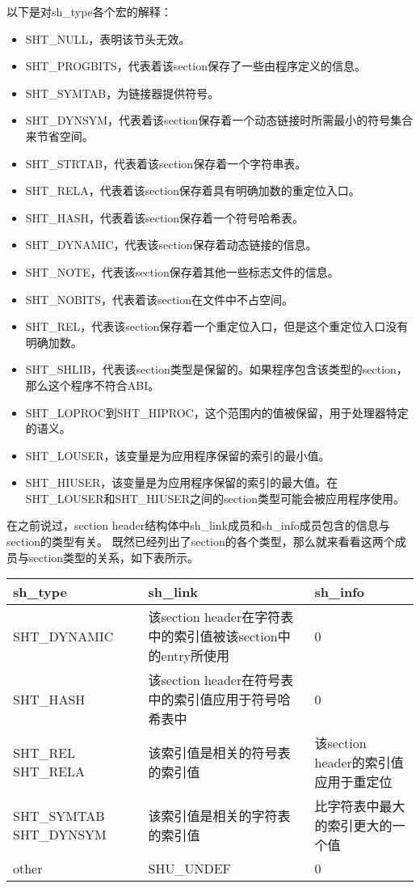 \documentclass[a4paper,left=2.5cm,right=2.5cm,11pt]{article}
\begin{document}
	以下是对sh\_type各个宏的解释：
	\begin{itemize}
		\item SHT\_NULL，表明该节头无效。
		\item SHT\_PROGBITS，代表着该section保存了一些由程序定义的信息。
		\item SHT\_SYMTAB，为链接器提供符号。
		\item SHT\_DYNSYM，代表着该section保存着一个动态链接时所需最小的符号集合来节省空间。
		\item SHT\_STRTAB，代表着该section保存着一个字符串表。
		\item SHT\_RELA，代表着该section保存着具有明确加数的重定位入口。
		\item SHT\_HASH，代表着该section保存着一个符号哈希表。
		\item SHT\_DYNAMIC，代表该section保存着动态链接的信息。
		\item SHT\_NOTE，代表该section保存着其他一些标志文件的信息。
		\item SHT\_NOBITS，代表着该section在文件中不占空间。
		\item SHT\_REL，代表该section保存着一个重定位入口，但是这个重定位入口没有明确加数。
		\item SHT\_SHLIB，代表该section类型是保留的。如果程序包含该类型的section，那么这个程序不符合ABI。
		\item SHT\_LOPROC到SHT\_HIPROC，这个范围内的值被保留，用于处理器特定的语义。
		\item SHT\_LOUSER，该变量是为应用程序保留的索引的最小值。
		\item SHT\_HIUSER，该变量是为应用程序保留的索引的最大值。在SHT\_LOUSER和SHT\_HIUSER之间的section类型可能会被应用程序使用。
	\end{itemize}

	在之前说过，section header结构体中sh\_link成员和sh\_info成员包含的信息与section的类型有关。
	既然已经列出了section的各个类型，那么就来看看这两个成员与section类型的关系，如下表所示。
	
	\vspace{1em}

	\begin{longtable}{p{3cm}|p{5cm}|p{5cm}}
	\hline
	sh\_type & sh\_link & sh\_info \\
	\hline
	SHT\_DYNAMIC & 该section header在字符表中的索引值被该section中的entry所使用 & 0\\
	\hline
	SHT\_HASH & 该section header在符号表中的索引值应用于符号哈希表中 & 0\\
	\hline
	SHT\_REL SHT\_RELA & 该索引值是相关的符号表的索引值 & 该section header的索引值应用于重定位\\
	\hline
	SHT\_SYMTAB SHT\_DYNSYM & 该索引值是相关的字符表的索引值 & 比字符表中最大的索引更大的一个值 \\
	\hline
	other & SHU\_UNDEF & 0 \\
	\hline
	\end{longtable}
\end{document}
